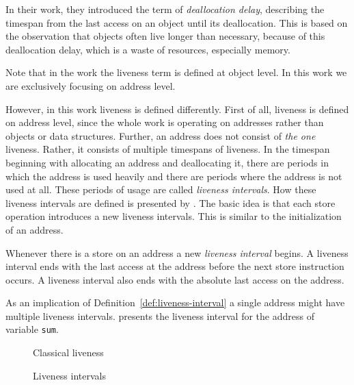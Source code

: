 \documentclass[onecolumn, openright, master, english, signatures]{dbrgrptt}
\begin{document}
In their work, they introduced the term of \emph{deallocation delay}, describing the timespan from the last access on an object until its deallocation.
This is based on the observation that objects often live longer than necessary, because of this deallocation delay, which is a waste of resources, especially memory.

\begin{remark}
Note that in the work \cite{aigner2013acdc} the liveness term is defined at object level. In this work we are exclusively focusing on address level.
\end{remark}

However, in this work liveness is defined differently.
First of all, liveness is defined on address level, since the whole work is operating on addresses rather than objects or data structures.
Further, an address does not consist of \emph{the one} liveness.
Rather, it consists of multiple timespans of liveness.
In the timespan beginning with allocating an address and deallocating it, there are periods in which the address is used heavily and there are periods where the address is not used at all.
These periods of usage are called \emph{liveness intervals}.
How these liveness intervals are defined is presented by .
The basic idea is that each store operation introduces a new liveness intervals.
This is similar to the initialization of an address.

\begin{definition}\label{def:liveness-interval}
Whenever there is a store on an address a new \emph{liveness interval} begins. A liveness interval ends with the last access at the address before the next store instruction occurs. A liveness interval also ends with the absolute last access on the address.
\end{definition}

\begin{remark}
As an implication of Definition~\ref{def:liveness-interval} a single address might have multiple liveness intervals.
 presents the liveness interval for the address of variable \texttt{sum}.
\end{remark}

\begin{figure}[!ht]
  \centering
  
  \caption{Classical liveness}
  \label{fig:liveness-classical}
\end{figure}

\begin{figure}[!ht]
  \centering
  
  \caption{Liveness intervals}
  \label{fig:liveness-intervals}
\end{figure}
\end{document}
